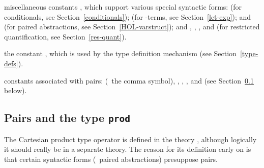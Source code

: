 \begin{myenumerate}
\item miscellaneous constants%
%
%
%
%
%
%
%
%
%
, which support various special syntactic forms:
 (for conditionals, see Section~\ref{conditionals});
 (for -terms, see Section~\ref{let-exp});
 and  (for paired abstractions,
see Section~\ref{HOL-varstruct}); and
,
,
,
and  (for restricted quantification,
see Section~\ref{res-quant}).

\item the constant , which is used by the type definition mechanism (see Section~\ref{type-defs}).

\item constants associated with pairs:
 \ml{,} (\ie\ the comma symbol),
, , ,  and 
(see Section~\ref{prod} below).
\end{myenumerate}

\subsection{Pairs and the type {\tt prod}}\label{prod}

The Cartesian  product  type  operator   is  defined  in  the  theory , although logically it should really  be in  a separate  theory.  The
reason for its  definition early  on is that certain  syntactic forms (\eg\
paired abstractions) presuppose pairs.

